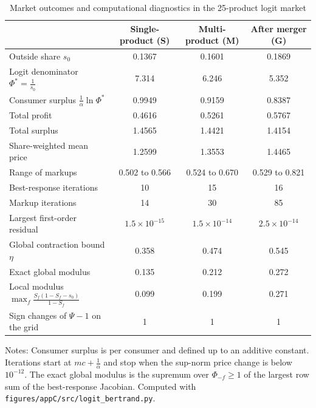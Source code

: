 \begin{table}[htbp]
\centering
\caption{Market outcomes and computational diagnostics in the 25-product logit market}
\label{tab:C-logit-market}
\footnotesize
\begin{tabular}{@{}lccc@{}}
\toprule
 & Single-product (S) & Multi-product (M) & After merger (G) \\
\midrule
Outside share $s_0$ & 0.1367 & 0.1601 & 0.1869 \\
Logit denominator $\Phi^* = \frac{1}{s_0}$ & 7.314 & 6.246 & 5.352 \\
Consumer surplus $\frac{1}{\alpha}\ln\Phi^*$ & 0.9949 & 0.9159 & 0.8387 \\
Total profit & 0.4616 & 0.5261 & 0.5767 \\
Total surplus & 1.4565 & 1.4421 & 1.4154 \\
Share-weighted mean price & 1.2599 & 1.3553 & 1.4465 \\
Range of markups & 0.502 to 0.566 & 0.524 to 0.670 & 0.529 to 0.821 \\
\midrule
Best-response iterations & 10 & 15 & 16 \\
Markup iterations & 14 & 30 & 85 \\
Largest first-order residual & $1.5\times10^{-15}$ & $1.5\times10^{-14}$ & $2.5\times10^{-14}$ \\
Global contraction bound $\eta$ & 0.358 & 0.474 & 0.545 \\
Exact global modulus & 0.135 & 0.212 & 0.272 \\
Local modulus $\max_f\frac{S_f(1 - S_f - s_0)}{1 - S_f}$ & 0.099 & 0.199 & 0.271 \\
Sign changes of $\Psi - 1$ on the grid & 1 & 1 & 1 \\
\bottomrule
\end{tabular}

\vspace{3pt}
\begin{minipage}{0.97\textwidth}
\footnotesize Notes: Consumer surplus is per consumer and defined up to an additive constant. Iterations start at
$mc + \frac{1}{\alpha}$ and stop when the sup-norm price change is below $10^{-12}$. The exact global modulus is
the supremum over $\Phi_{-f} \ge 1$ of the largest row sum of the best-response Jacobian. Computed with
\texttt{figures/appC/src/logit\_bertrand.py}.
\end{minipage}
\end{table}

